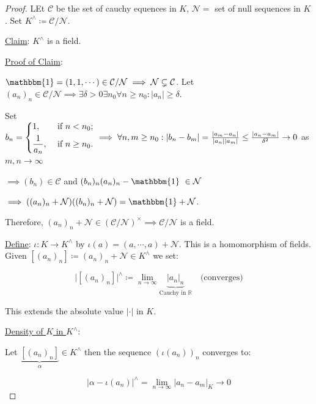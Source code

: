 \documentclass[openany]{amsbook}
\numberwithin{section}{chapter}
\theoremstyle{definition}
\begin{document}
\begin{proof}
    LEt \(\mathcal{C}\) be the set of cauchy equences in \(K\), \(\mathcal{N} =\) set of null sequences in \(K\). Set \(K^\wedge\coloneqq \mathcal{C} / \mathcal{N}\).

    \underline{Claim}: \(K^\wedge\) is a field.

    \underline{Proof of Claim}: 
    
    \(\mathbbm{1} = (1, 1,\cdots ) \in \mathcal{C} / \mathcal{N} \implies \mathcal{N} \subsetneq \mathcal{C}\). Let \((a_n)_n \in \mathcal{C} / \mathcal{N} \implies \exists \delta > 0 \exists n_0 \forall n \geq n_0: \vert a_n \vert \geq \delta\).
    
    Set \(b_n = \begin{dcases}
        1, &\text{ if } n < n_0 ;\\
        \frac{1}{a_n}, &\text{ if } n \geq n_0.
    \end{dcases} \implies \forall n, m \geq n_0: \vert b_n - b_m \vert = \frac{\vert a_m - a_n \vert}{\vert a_n \vert \vert a_m \vert} \leq \frac{\vert a_n - a_m \vert}{\delta^2}\to 0\) as \(m, n \to \infty\) 

    \(\implies (b_n) \in \mathcal{C}\) and \((b_n)_n (a_n)_n - \mathbbm{1}\ \in \mathcal{N} \)
    
    \(\implies ((a_n)_n + \mathcal{N})((b_n)_n + \mathcal{N}) = \mathbbm{1} + \mathcal{N}\).
    
    Therefore, \((a_n)_n +\mathcal{N} \in (\mathcal{C} / \mathcal{N})^\times \implies \mathcal{C} / \mathcal{N}\) is a field. 

    \underline{Define}: \(\iota : K \to K^{\wedge}\) by \(\iota (a) = (a, \cdots , a) + \mathcal{N}\). This is a homomorphism of fields. Given \([(a_n)_n]\coloneqq (a_n)_n + \mathcal{N} \in K^\wedge\) we set:

    \[
        \vert [(a_n)_n] \vert ^\wedge \coloneqq \lim_{n \to \infty} \underbrace{\vert a_n \vert _n}_{\text{Cauchy in }\mathbb{R}} \quad \text{(converges)} 
    \]

    This extends the absolute value \(\vert \cdot \vert\) in \(K\).

    \underline{Density of \(K\) in \(K^\wedge\)}:
    
    Let \(\underbrace{[(a_n)_n]}_{\alpha}\in K^\wedge\) then the sequence \((\iota(a_n))_n\) converges to:
    
    \[
        \vert \alpha - \iota (a_n) \vert ^\wedge = \lim_{n \to \infty} \vert a_n - a_m \vert _K \to 0
    \]


\end{proof}
\end{document}
